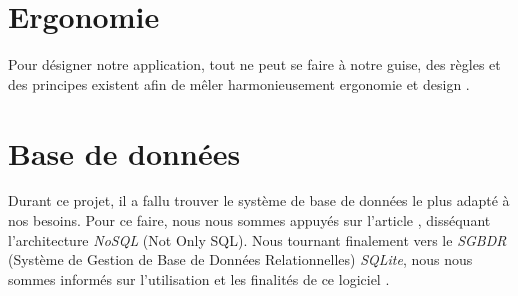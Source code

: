 \section{Ergonomie}
Pour désigner notre application, tout ne peut se faire à notre guise, des règles et des principes existent afin de mêler harmonieusement ergonomie et design \cite{lente2014scenariser}.

\section{Base de données}

Durant ce projet, il a fallu trouver le système de base de données le plus adapté à nos besoins. Pour ce faire, nous nous sommes appuyés sur l'article \cite{strauchnosql}, disséquant l'architecture \textit{NoSQL} (Not Only SQL).
Nous tournant finalement vers le \textit{SGBDR} (Système de Gestion de Base de Données Relationnelles) \textit{SQLite}, nous nous sommes informés sur l'utilisation et les finalités de ce logiciel \cite{kreibich2010using}.

